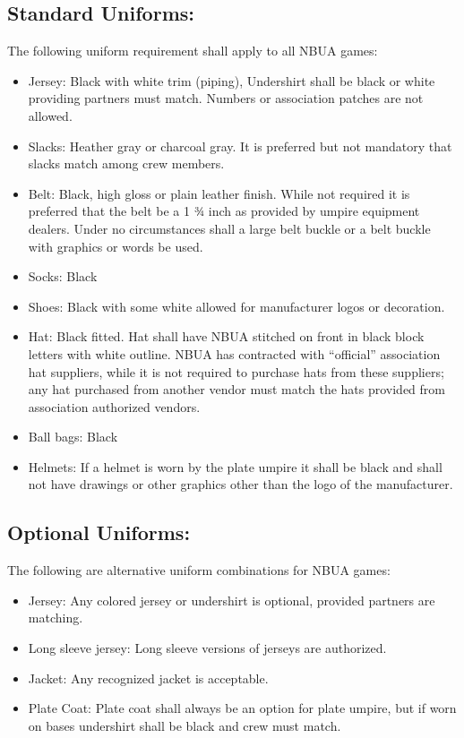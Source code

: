 \documentclass[letterpaper,11pt,colorlinks=true,allcolors=blue]{article}
\begin{document}
\subsection*{Standard Uniforms:} 
The following uniform requirement shall apply to all NBUA games:
\begin{itemize}
\item Jersey: Black with white trim (piping), Undershirt shall be black or white providing partners must match. Numbers or association patches are not allowed.
\item Slacks: Heather gray or charcoal gray. It is preferred but not mandatory that slacks match among crew members. 
\item Belt: Black, high gloss or plain leather finish. While not required it is preferred that the belt be a 1 ¾ inch as provided by umpire equipment dealers. Under no circumstances shall a large belt buckle or a belt buckle with graphics or words be used.
\item Socks: Black
\item Shoes: Black with some white allowed for manufacturer logos or decoration.
\item Hat: Black fitted. Hat shall have NBUA stitched on front in black block letters with white outline. NBUA has contracted with “official” association hat suppliers, while it is not required to purchase hats from these suppliers; any hat purchased from another vendor must match the hats provided from association authorized vendors. 
\item Ball bags: Black
\item Helmets: If a helmet is worn by the plate umpire it shall be black and shall not have drawings or other graphics other than the logo of the manufacturer.
\end{itemize}

\subsection*{Optional Uniforms:} 
The following are alternative uniform combinations for NBUA games:
\begin{itemize}
\item Jersey: Any colored jersey or undershirt is optional, provided partners are matching.
\item Long sleeve jersey: Long sleeve versions of jerseys are authorized.
\item Jacket: Any recognized jacket is acceptable.
\item Plate Coat: Plate coat shall always be an option for plate umpire, but if worn on bases undershirt shall be black and crew must match.
\end{itemize}
\end{document}

